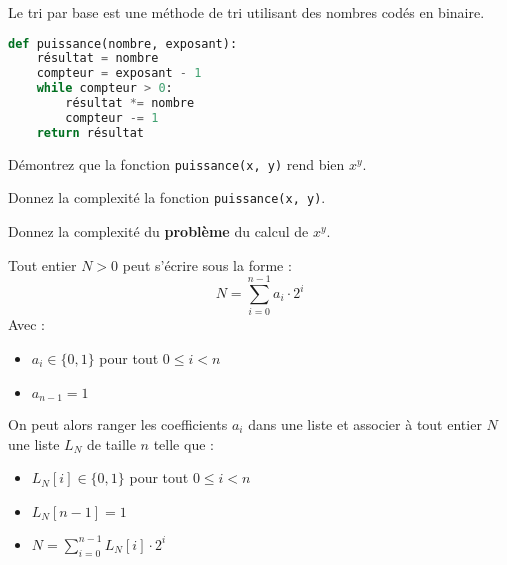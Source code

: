 
\clearpage
\begin{exo}

Le tri par base est une méthode de tri utilisant des nombres codés en binaire. 

\begin{partie}[Puissance]\label{puissance}

\begin{lstlisting}[language=Python]
def puissance(nombre, exposant):
    résultat = nombre
    compteur = exposant - 1
    while compteur > 0:
        résultat *= nombre
        compteur -= 1
    return résultat
\end{lstlisting}

\begin{questionpartie} 
Démontrez que la fonction \verb|puissance(x, y)| rend bien $x^y$.
\end{questionpartie}

\begin{questionpartie} 
Donnez la complexité la fonction \verb|puissance(x, y)|.
\end{questionpartie}

\begin{questionpartie} 
Donnez la complexité du {\bf problème} du calcul de $x^y$.
\end{questionpartie}
\end{partie}

\begin{partie}

Tout entier $N>0$ peut s'écrire sous la forme :
$$
N = \sum_{i=0}^{n-1}a_i\cdot 2^i
$$
Avec :
\begin{itemize}
\item $a_i \in \{0, 1\}$ pour tout $0\leq i < n$
\item $a_{n-1} =1$
\end{itemize}

On peut alors ranger les coefficients $a_i$ dans une liste et associer à tout entier $N$ une liste $L_N$ de taille $n$ telle que :

\begin{itemize}
\item $L_N[i] \in \{0, 1\}$ pour tout $0\leq i < n$
\item $L_N[n-1] =1$
\item $N = \sum_{i=0}^{n-1}L_N[i]\cdot 2^i$
\end{itemize}


\end{partie}
\end{exo}
